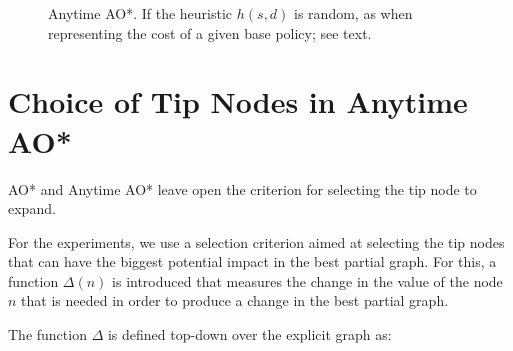 \documentclass[letterpaper]{article}
\newcommand{\Omit}[1]{}
\begin{document}
\begin{figure}[t]
\centering
{}
\caption{Anytime AO*. If the heuristic $h(s,d)$ is random, as
when representing the cost of a given base policy; see text.}
\label{fig:anytime-ao*}
\end{figure}


\section{Choice of Tip Nodes in Anytime AO*}

AO* and Anytime AO* leave  open the criterion for selecting
the tip node to expand.
\Omit{
}
For the experiments, we  use a selection  criterion aimed at selecting the tip
nodes that can have the biggest potential impact in the best partial graph.
For this,    a  function $\Delta(n)$ is introduced that measures the change in the  value of the
node $n$ that is needed in order to produce a change in the  best partial graph.
\Omit{
Nodes that are part
of the best solution graph have non-negative $\Delta$'s, as their
$V$ or $Q$ values must increase for then being excluded from the
best solution graph. On the other hand, nodes that are not part
of the best solution graph have non-positive $\Delta$'s, as their
$V$ or $Q$ values must decrease for them becoming part of the
best solution graph. }
The function $\Delta$ is defined top-down over the explicit graph
as:
\end{document}
